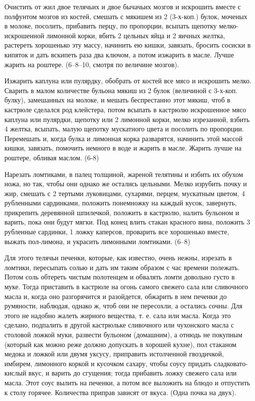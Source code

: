 
Очистить от жил двое телячьих и двое бычачьих мозгов и искрошить вместе с полфунтом мозгов из костей, смешать с мякишем из 2 (3-х-коп.) булок, моченых в молоке, посолить, прибавить перцу, по пропорции, всыпать щепотку мелко-искрошенной лимонной корки, вбить 2 цельных яйца и 2 яичных желтка, растереть хорошенько эту массу, начинить ею кишки, завязать, бросить сосиски в кипяток и дать вскипеть раза два ключом, а потом изжарить в масле. Лучше жарить на роштере. (6--8--10, смотря по величине мозгов). 


Изжарить каплуна или пулярдку, обобрать от костей все мясо и искрошить мелко. Сварить в малом количестве бульона мякиш из 2 булок (величиной с 3-х-коп. булку), замешанных на молоке, и мешать беспрестанно этот мякиш, чтоб в кастрюле сделался род клейстера, потом всыпать в кастрюлю искрошенное мясо каплуна или пулярдки, щепотку или 2 лимонной корки, мелко изрезанной, взбить 4 желтка, всыпать, малую щепотку мускатного цвета и посолить по пропорции. Перемешать и, когда булка и лимонная корка разварятся, начинить этой массой кишки, завязать, помочить немного в воде и жарить в масле. Жарить лучше на роштере, обливая маслом. (6-8) 


Нарезать ломтиками, в палец толщиной, жареной телятины и избить их обухом ножа, но так, чтобы они однако же остались цельными. Мелко изрубить почку и жир, смешать с 2 тертыми луковицами, сухарями, перцем, мускатным цветом, 4 рубленными сардинками, положить понемножку на каждый кусок, завернуть, прикрепить деревянной шпилечкой, положить в кастрюлю, налить бульоном и варить, пока они будут мягки. Под конец влить стакан красного вина, положить 3 рубленные сардинки, 1 ложку каперсов, проварить все хорошенько вместе, выжать пол-лимона, и украсить лимонными ломтиками. (6--8) 


Для этого телячьи печенки, которые, как известно, очень нежны, изрезать в ломтики, пересыпать солью и дать им таким образом с час времени полежать. Потом соль обтереть чистым полотенцем и обвалять ломти довольно густо в муке. Тогда приставить в кастрюле на огонь самого свежего сала или сливочного масла и, когда оно разгорячится и разойдется, обжарить в нем печенки до румяности, наблюдая, однако ж, чтоб они не пересохли, а остались сочны. Для этого не надобно жалеть жирного вещества, т. е. сала или масла. Когда это сделано, подпалить в другой кастрюльке сливочного или чухонского масла с столовой ложкой муки, развести бульоном (домашним), а отнюдь не покупным (который как можно реже должно допускать в хорошей кухне), пол стаканом медока и ложкой или двумя уксусу, приправить истолченной гвоздичкой, имбирем, лимонного коркой и кусочком сахару, чтобы соусу придать сладковато-кислый вкус, и варить до сгущения; тогда прибавить ложку свежего сала или масла. Этот соус вылить на печенки, а потом все выложить на блюдо и отпустить к столу горячее. Количества приправ зависят от вкуса. (Одна почка на двух). 

